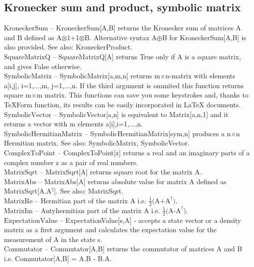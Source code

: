 \subsection{Kronecker sum and product, symbolic matrix}

\noindent\textbf{$ \text{KroneckerSum} $ }-- KroneckerSum[A,B] returns the Kronecker sum of matrices A and B defined as A$\otimes $1+1$\otimes $B. Alternative syntax A$\oplus $B for KroneckerSum[A,B] is also provided. See also: KroneckerProduct.$  $\\
\noindent\textbf{$ \text{SquareMatrixQ} $ }-- SquareMatrixQ[A] returns True only if A is a square matrix, and gives False otherwise.$  $\\
\noindent\textbf{$ \text{SymbolicMatrix} $ }-- SymbolicMatrix[a,m,n] returns m$\times $n-matrix with elements a[i,j], i=1,...,m, j=1,...,n. If the third argument is ommited this function returns square m$\times $m matrix. This functions can save you some keystrokes and, thanks to TeXForm function, its results can be easily incorporated in LaTeX documents.$  $\\
\noindent\textbf{$ \text{SymbolicVector} $ }-- SymbolicVector[a,n] is equivalent to Matrix[a,n,1] and it returns a vector with m elements a[i],i=1,...,n.$  $\\
\noindent\textbf{$ \text{SymbolicHermitianMatrix} $ }-- SymbolicHermitianMatrix[sym,n] produces a n$\times $n Hermitian matrix. See also: SymbolicMatrix, SymbolicVector.$  $\\
\noindent\textbf{$ \text{ComplexToPoint} $ }-- ComplexToPoint[z] returns a real and an imaginary parts of a complex number z as a pair of real numbers.$  $\\
\noindent\textbf{$ \text{MatrixSqrt} $ }-- MatrixSqrt[A] returns square root for the matrix A.$  $\\
\noindent\textbf{$ \text{MatrixAbs} $ }-- MatrixAbs[A] returns absolute value for matrix A defined as MatrixSqrt[A.A$  ^{\dagger } $]. See also: MatrixSqrt.$  $\\
\noindent\textbf{$ \text{MatrixRe} $ }-- Hermitian part of the matrix A i.e. $ \frac{1}{2}\text{(A+A} ^{\dagger }\text{).} $\\
\noindent\textbf{$ \text{MatrixIm} $ }-- Antyhermitian part of the matrix A i.e. $ \frac{1}{2}\text{(A-A} ^{\dagger }\text{).} $\\
\noindent\textbf{$ \text{ExpectationValue} $ }-- ExpectationValue[s,A] - accepts a state vector or a density matrix as a first argument and calculates the expectation value for the measurement of A in the state s.$  $\\
\noindent\textbf{$ \text{Commutator} $ }-- Commutator[A,B] returns the commutator of matrices A and B i.e. Commutator[A,B] = A.B - B.A.$  $\\
